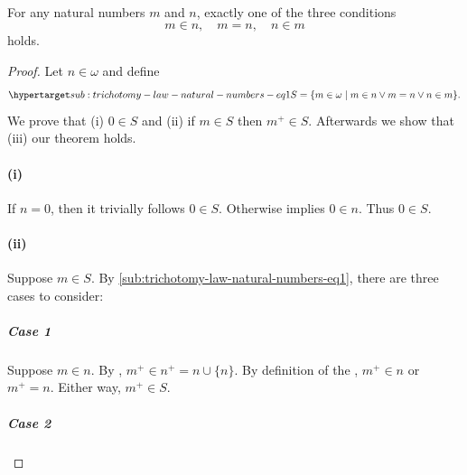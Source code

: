 \documentclass{report}
\begin{document}
\subsection{}%

  \begin{theorem}
    For any natural numbers $m$ and $n$, exactly one of the three conditions
      $$m \in n, \quad m = n, \quad n \in m$$ holds.
  \end{theorem}



  \begin{proof}

    Let $n \in \omega$ and define
      \begin{equation}
        \hyperlabel{sub:trichotomy-law-natural-numbers-eq1}
        S = \{m \in \omega \mid m \in n \lor m = n \lor n \in m\}.
      \end{equation}
    We prove that (i) $0 \in S$ and (ii) if $m \in S$ then $m^+ \in S$.
    Afterwards we show that (iii) our theorem holds.

    \paragraph{(i)}%

      If $n = 0$, then it trivially follows $0 \in S$.
      Otherwise  implies $0 \in n$.
      Thus $0 \in S$.

    \paragraph{(ii)}%

      Suppose $m \in S$.
      By \eqref{sub:trichotomy-law-natural-numbers-eq1}, there are three cases
        to consider:

      \subparagraph{Case 1}%

        Suppose $m \in n$.
        By , $m^+ \in n^+ = n \cup \{n\}$.
        By definition of the , $m^+ \in n$ or $m^+ = n$.
        Either way, $m^+ \in S$.

      \subparagraph{Case 2}%


\end{proof}
\end{document}
